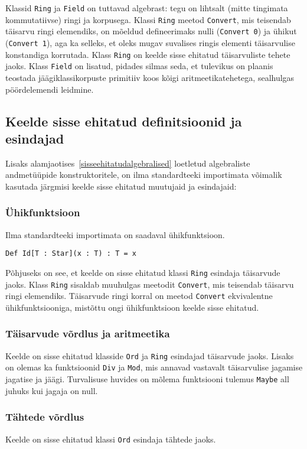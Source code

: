 \documentclass[12pt]{article}
\begin{document}
        Klassid \verb!Ring! ja \verb!Field! on tuttavad algebrast: tegu on lihtsalt (mitte tingimata kommutatiivse) ringi ja korpusega. Klassi \verb!Ring! meetod \verb!Convert!, mis teisendab täisarvu ringi elemendiks, on mõeldud defineerimaks nulli (\verb!Convert 0!) ja ühikut (\verb!Convert 1!), aga ka selleks, et oleks mugav suvalises ringis elementi täisarvulise konstandiga korrutada. Klass \verb!Ring! on keelde sisse ehitatud täisarvuliste tehete jaoks. Klass \verb!Field! on lisatud, pidades silmas seda, et tulevikus on plaanis teostada jäägiklassikorpuste primitiiv koos kõigi aritmeetikatehetega, sealhulgas pöördelemendi leidmine.
    \subsection{Keelde sisse ehitatud definitsioonid ja esindajad}
      Lisaks alamjaotises~\ref{sisseehitatudalgebralised} loetletud algebraliste andmetüüpide konstruktoritele, on ilma standardteeki importimata võimalik kasutada järgmisi keelde sisse ehitatud muutujaid ja esindajaid:
      \subsubsection{Ühikfunktsioon}
        Ilma standardteeki importimata on saadaval ühikfunktsioon.

        \begin{verbatim}Def Id[T : Star](x : T) : T = x\end{verbatim}

        Põhjuseks on see, et keelde on sisse ehitatud klassi \verb!Ring! esindaja täisarvude jaoks. Klass \verb!Ring! sisaldab muuhulgas meetodit \verb!Convert!, mis teisendab täisarvu ringi elemendiks. Täisarvude ringi korral on meetod \verb!Convert! ekvivalentne ühikfunktsiooniga, mistõttu ongi ühikfunktsioon keelde sisse ehitatud.
      \subsubsection{Täisarvude võrdlus ja aritmeetika}
        Keelde on sisse ehitatud klasside \verb!Ord! ja \verb!Ring! esindajad täisarvude jaoks. Lisaks on olemas ka funktsioonid \verb!Div! ja \verb!Mod!, mis annavad vastavalt täisarvulise jagamise jagatise ja jäägi. Turvalisuse huvides on mõlema funktsiooni tulemus \verb!Maybe! all juhuks kui jagaja on null.
      \subsubsection{Tähtede võrdlus}
        Keelde on sisse ehitatud klassi \verb!Ord! esindaja tähtede jaoks.
\end{document}
